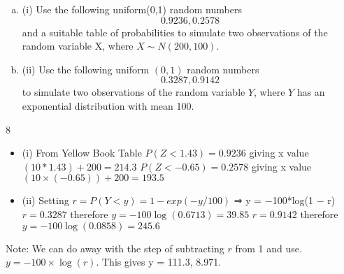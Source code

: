 \documentclass[a4paper,12pt]{article}
\begin{document}
\begin{enumerate}[(a)]
\item (i)
Use the following uniform(0,1) random numbers
\[0.9236 , 0.2578\]
and a suitable table of probabilities to simulate two observations of the random
variable X, where $X \sim N(200,100)$.
\item (ii)
Use the following uniform $(0,1)$ random numbers
\[0.3287 , 0.9142\]
to simulate two observations of the random variable $Y$, where $Y$ has an exponential distribution with mean 100.
\end{enumerate}


8
\begin{itemize}
    \item 

(i)
From Yellow Book Table
$P(Z < 1.43) = 0.9236$ giving x value $(10*1.43) + 200 = 214.3$
$P(Z < −0.65) = 0.2578$ giving x value $(10\times (−0.65)) + 200 = 193.5$

\item (ii)
Setting $r = P(Y < y) = 1 - exp(−y/100)$ ⇒ y = −100*log(1 − r)
$r = 0.3287$ therefore $y = −100 \log(0.6713) = 39.85$
$r = 0.9142$ therefore $y = −100 \log(0.0858) = 245.6$
\end{itemize}
Note: We can do away with the step of subtracting $r$ from 1 and use.
$y = −100\times \log(r)$. This gives y = 111.3, 8.971.
\end{document}
